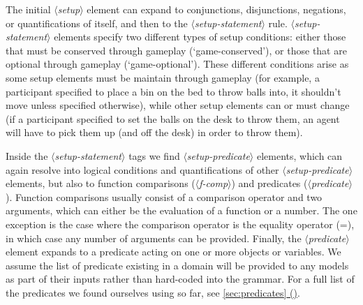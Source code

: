 \documentclass{article}
\newcommand{\dsl}[1]{{\it $\langle$#1$\rangle$}}
\newcommand*{\fullref}[1]{\hyperref[{#1}]{\autoref*{#1} (\nameref*{#1})}} %
\begin{document}
The initial \dsl{setup} element can expand to conjunctions, disjunctions, negations, or quantifications of itself, and then to the \dsl{setup-statement} rule.
\dsl{setup-statement} elements specify two different types of setup conditions: either those that must be conserved through gameplay (`game-conserved'), or those that are optional through gameplay (`game-optional').
These different conditions arise as some setup elements must be maintain through gameplay (for example, a participant specified to place a bin on the bed to throw balls into, it shouldn't move unless specified otherwise), while other setup elements can or must change (if a participant specified to set the balls on the desk to throw them, an agent will have to pick them up (and off the desk) in order to throw them).

Inside the \dsl{setup-statement} tags we find \dsl{setup-predicate} elements, which can again resolve into logical conditions and quantifications of other \dsl{setup-predicate} elements, but also to function comparisons (\dsl{f-comp}) and predicates (\dsl{predicate}).
Function comparisons usually consist of a comparison operator and two arguments, which can either be the evaluation of a function or a number.
The one exception is the case where the comparison operator is the equality operator (=), in which case any number of arguments can be provided.
Finally, the \dsl{predicate} element expands to a predicate acting on one or more objects or variables.
We assume the list of predicate existing in a domain will be provided to any models as part of their inputs rather than hard-coded into the grammar.
For a full list of the predicates we found ourselves using so far, see \fullref{sec:predicates}.
\end{document}
